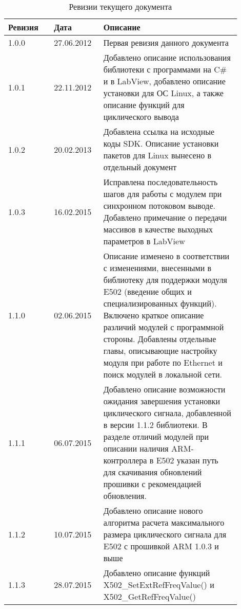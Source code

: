 \documentclass[12pt,a4paper,titlepage]{report}
\begin{document}
  \begin{longtable}{|m{0.18\linewidth}|m{0.18\linewidth}|m{0.54\linewidth}|}
  \caption{Ревизии текущего документа}\\\hline
  \textbf{Ревизия} & \textbf{Дата} & \textbf{Описание}\\\hline
  1.0.0            & 27.06.2012    & Первая ревизия данного документа \\\hline
  1.0.1            & 22.11.2012    & Добавлено описание использования библиотеки с программами на C\# и в LabView, добавлено описание установки для ОС Linux, а также описание функций для циклического вывода \\\hline
  1.0.2            & 20.02.2013    & Добавлена ссылка на исходные коды SDK. Описание установки пакетов для Linux вынесено в отдельный документ \\\hline
  1.0.3            & 16.02.2015    & Исправлена последовательность шагов для работы с модулем при синхронном потоковом выводе. Добавлено примечание о передачи массивов в качестве выходных параметров в LabView \\\hline
  1.1.0            & 02.06.2015    & Описание изменено в соответствии с изменениями, внесенными в библиотеку для поддержки модуля E502 (введение общих и специализированных функций). Включено краткое описание различий модулей с программной стороны. Добавлены отдельные главы, описывающие настройку модуля при работе по Ethernet и поиск модулей в локальной сети. \\\hline
  1.1.1            & 06.07.2015    & Добавлено описание возможности ожидания завершения установки циклического сигнала, добавленной в версии 1.1.2 библиотеки. В разделе отличий модулей при описании наличия ARM-контроллера в E502 указан путь для скачивания обновлений прошивки с рекомендацией обновления. \\\hline
  1.1.2            & 10.07.2015    & Добавлено описание нового алгоритма расчета максимального размера циклического сигнала для E502 с прошивкой ARM 1.0.3 и выше \\\hline
  1.1.3            & 28.07.2015    & Добавлено описание функций X502\_SetExtRefFreqValue() и X502\_GetRefFreqValue() \\\hline

\end{longtable}
\end{document}
